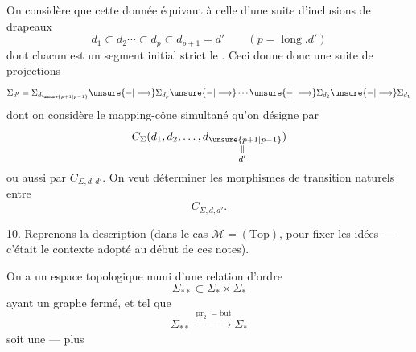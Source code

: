 
On considère que cette donnée équivaut à celle d'une
suite d'inclusions de drapeaux
\[
 d_1\subset d_2\cdots\subset d_p\subset d_{p+1}=d'
 \qquad(p=\operatorname{long}.d')
\]
dont chacun est un segment initial strict 
le .
Ceci donne donc  une
suite de projections
\[
 \Sigma_{d'}=\Sigma_{d_{\unsure{p+1|p-1}}}\unsure{-|\longrightarrow}\Sigma_{d_p}
 \unsure{-|\longrightarrow}\cdots\unsure{-|\longrightarrow}\Sigma_{d_2}
 \unsure{-|\longrightarrow}\Sigma_{d_1}
\]
dont on considère le mapping-cône simultané
qu'on désigne par
\[
 C_\Sigma(d_1,d_2,\ldots,
 \underset{\substack{\Vert\\d'}}{d_{\unsure{p+1|p-1}}})
\]
ou aussi par \(C_{\Sigma,d,d'}\).
On veut déterminer les
morphismes  de transition naturels entre
\[
 C_{\Sigma,d,d'}.
\]



\uline{10.} Reprenons la description 
(dans le cas \(\mathcal M=(\mathrm{Top})\), pour fixer les idées
--- c'était le contexte adopté au début de ces notes).

On a un espace topologique
muni d'une relation d'ordre
\[
 \Sigma_{**}\subset\Sigma_*\times\Sigma_*
\]
ayant un graphe fermé, et tel que
\[
 \Sigma_{**}\xrightarrow{\operatorname{pr}_2=\mathrm{but}}\Sigma_*
\]
soit une  --- plus

